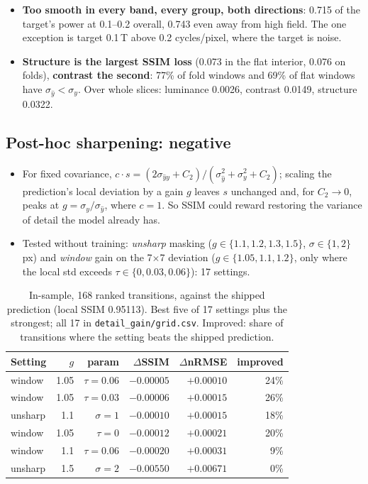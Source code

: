 \documentclass[10pt,a4paper]{article}
\begin{document}
\begin{itemize}
  \item \textbf{Too smooth in every band, every group, both directions}: 0.715 of the target's
        power at 0.1--0.2 overall, 0.743 even away from high field. The one exception is target
        0.1\,T above 0.2 cycles/pixel, where the target is noise.
  \item \textbf{Structure is the largest SSIM loss} (0.073 in the flat interior, 0.076 on
        folds), \textbf{contrast the second}: 77\% of fold windows and 69\% of flat windows have
        $\sigma_{\hat y} < \sigma_y$. Over whole slices: luminance 0.0026, contrast 0.0149,
        structure 0.0322.
\end{itemize}

\subsection{Post-hoc sharpening: negative}\label{sec:e1}

\begin{itemize}
  \item For fixed covariance, $c\cdot s = (2\sigma_{\hat y y} + C_2)/(\sigma^2_{\hat y} +
        \sigma^2_y + C_2)$; scaling the prediction's local deviation by a gain $g$ leaves $s$
        unchanged and, for $C_2 \to 0$, peaks at $g = \sigma_y/\sigma_{\hat y}$, where $c = 1$.
        So SSIM could reward restoring the variance of detail the model already has.
  \item Tested without training: \emph{unsharp} masking ($g \in \{1.1, 1.2, 1.3, 1.5\}$,
        $\sigma \in \{1, 2\}$\,px) and \emph{window} gain on the 7$\times$7 deviation
        ($g \in \{1.05, 1.1, 1.2\}$, only where the local std exceeds
        $\tau \in \{0, 0.03, 0.06\}$): 17 settings.
\end{itemize}

\begin{table}[H]
\centering\small
\begin{tabular}{lrrrrr}
\toprule
Setting & $g$ & param & $\Delta$SSIM & $\Delta$nRMSE & improved \\
\midrule
window  & 1.05 & $\tau = 0.06$ & $-0.00005$ & $+0.00010$ & 24\% \\
window  & 1.05 & $\tau = 0.03$ & $-0.00006$ & $+0.00015$ & 26\% \\
unsharp & 1.1  & $\sigma = 1$  & $-0.00010$ & $+0.00015$ & 18\% \\
window  & 1.05 & $\tau = 0$    & $-0.00012$ & $+0.00021$ & 20\% \\
window  & 1.1  & $\tau = 0.06$ & $-0.00020$ & $+0.00031$ & 9\% \\
unsharp & 1.5  & $\sigma = 2$  & $-0.00550$ & $+0.00671$ & 0\% \\
\bottomrule
\end{tabular}
\caption{In-sample, 168 ranked transitions, against the shipped prediction (local SSIM 0.95113).
Best five of 17 settings plus the strongest; all 17 in \texttt{detail\_gain/grid.csv}.
Improved: share of transitions where the setting beats the shipped prediction.}
\label{tab:e1}
\end{table}
\end{document}
